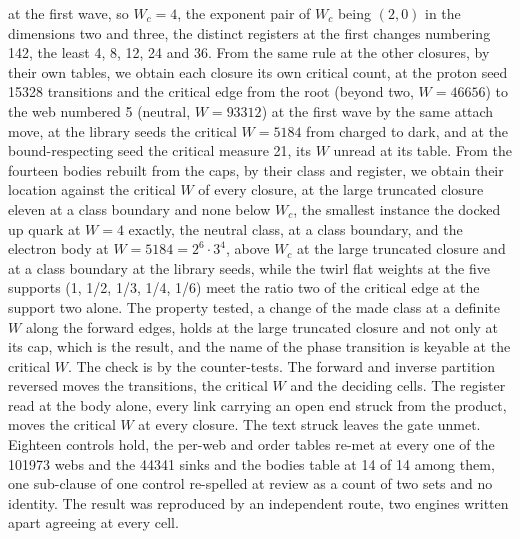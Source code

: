 \begin{chproof}[census]
at the first wave, so $W_{c} = 4$, the exponent pair of $W_{c}$ being $(2, 0)$ in the dimensions two and three, the distinct registers at the first changes numbering 142, the least 4, 8, 12, 24 and 36. From the same rule at the other closures, by their own tables, we obtain each closure its own critical count, at the proton seed 15328 transitions and the critical edge from the root (beyond two, $W = 46656$) to the web numbered 5 (neutral, $W = 93312$) at the first wave by the same attach move, at the library seeds the critical $W = 5184$ from charged to dark, and at the bound-respecting seed the critical measure 21, its $W$ unread at its table. From the fourteen bodies rebuilt from the caps, by their class and register, we obtain their location against the critical $W$ of every closure, at the large truncated closure eleven at a class boundary and none below $W_{c}$, the smallest instance the docked up quark at $W = 4$ exactly, the neutral class, at a class boundary, and the electron body at $W = 5184 = 2^{6} \cdot 3^{4}$, above $W_{c}$ at the large truncated closure and at a class boundary at the library seeds, while the twirl flat weights at the five supports (1, 1/2, 1/3, 1/4, 1/6) meet the ratio two of the critical edge at the support two alone. The property tested, a change of the made class at a definite $W$ along the forward edges, holds at the large truncated closure and not only at its cap, which is the result, and the name of the phase transition is keyable at the critical $W$.
The check is by the counter-tests. The forward and inverse partition reversed moves the transitions, the critical $W$ and the deciding cells. The register read at the body alone, every link carrying an open end struck from the product, moves the critical $W$ at every closure. The text struck leaves the gate unmet. Eighteen controls hold, the per-web and order tables re-met at every one of the 101973 webs and the 44341 sinks and the bodies table at 14 of 14 among them, one sub-clause of one control re-spelled at review as a count of two sets and no identity.
The result was reproduced by an independent route, two engines written apart agreeing at every cell.
\end{chproof}

\par\medskip{}\label{narr:close:11-5}\par
